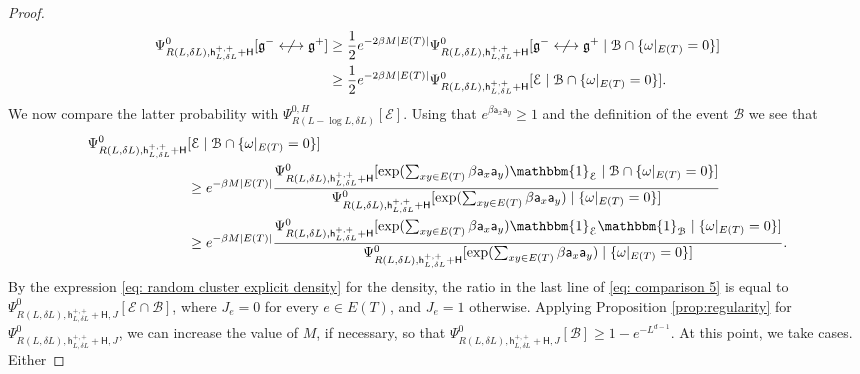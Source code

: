 \documentclass[11pt,a4paper]{article}
\theoremstyle{definition}
\numberwithin{equation}{section}
\newcommand\fg{\mathfrak{g}}
\begin{document}
\begin{proof}
\begin{equation}
\begin{aligned}
\Psi^{0}_{R(L,\delta L),\mathsf{h}^{+,+}_{L,\delta L}+\mathsf{H}}[\fg^{-} \centernot \longleftrightarrow \fg^{+}]&\geq \frac{1}{2} e^{-2\beta M |E(T)|}\Psi^{0}_{R(L,\delta L),\mathsf{h}^{+,+}_{L,\delta L}+\mathsf{H}}[\fg^{-} \centernot \longleftrightarrow \fg^{+}\mid \mathcal{B}\cap \{ \omega|_{E(T)}=0 \}]\\
&\geq \frac{1}{2} e^{-2\beta M |E(T)|}\Psi^{0}_{R(L,\delta L),\mathsf{h}^{+,+}_{L,\delta L}+\mathsf{H}}[\mathcal{E}\mid \mathcal{B}\cap \{ \omega|_{E(T)}=0 \}].
\end{aligned}
\end{equation}
We now compare the latter probability with $\Psi^{0,H}_{R(L-\log L,\delta L)}[\mathcal{E}]$.
Using that $e^{\beta \mathsf{a}_x \mathsf{a}_y}\geq 1$ and the definition of the event $\mathcal{B}$ we see that
\begin{equation}\label{eq: comparison 5}
\begin{aligned}
\Psi^{0}_{R(L,\delta L),\mathsf{h}^{+,+}_{L,\delta L}+\mathsf{H}}&[\mathcal{E}\mid \mathcal{B}\cap \{ \omega|_{E(T)}=0 \}] \\
 &\geq e^{-\beta M |E(T)|}\frac{\Psi^{0}_{R(L,\delta L),\mathsf{h}^{+,+}_{L,\delta L}+\mathsf{H}}[\exp(\sum_{xy \in E(T)}\beta \mathsf{a}_x \mathsf{a}_y)\mathbbm{1}_{\mathcal{E}} \mid \mathcal{B}\cap  \{ \omega|_{E(T)}=0 \}]}{\Psi^{0}_{R(L,\delta L),\mathsf{h}^{+,+}_{L,\delta L}+\mathsf{H}}[\exp(\sum_{xy \in E(T)}\beta \mathsf{a}_x \mathsf{a}_y) \mid   \{ \omega|_{E(T)}=0\}]}\\
  &\geq e^{-\beta M |E(T)|}\frac{\Psi^{0}_{R(L,\delta L),\mathsf{h}^{+,+}_{L,\delta L}+\mathsf{H}}[\exp(\sum_{xy \in E(T)}\beta \mathsf{a}_x \mathsf{a}_y)\mathbbm{1}_{\mathcal{E}} \mathbbm{1}_{\mathcal{B}} \mid   \{ \omega|_{E(T)}=0 \}]}{\Psi^{0}_{R(L,\delta L),\mathsf{h}^{+,+}_{L,\delta L}+\mathsf{H}}[\exp(\sum_{xy \in E(T)}\beta \mathsf{a}_x \mathsf{a}_y) \mid   \{ \omega|_{E(T)}=0 \}]}.
\end{aligned}
\end{equation}
By the expression \eqref{eq: random cluster explicit density} for the density, the ratio in the last line of \eqref{eq: comparison 5} is equal to $\Psi^{0}_{R(L,\delta L),\mathsf{h}^{+,+}_{L,\delta L}+\mathsf{H},J}[\mathcal{E} \cap \mathcal{B}]$, where $J_e=0$ for every $e\in E(T)$, and $J_e=1$ otherwise. Applying Proposition \ref{prop:regularity} for $\Psi^{0}_{R(L,\delta L),\mathsf{h}^{+,+}_{L,\delta L}+\mathsf{H},J}$, we can increase the value of $M$, if necessary, so that $\Psi^{0}_{R(L,\delta L),\mathsf{h}^{+,+}_{L,\delta L}+\mathsf{H},J}[\mathcal{B}]\geq 1-e^{-L^{d-1}}$. At this point, we take cases. Either

\end{proof}
\end{document}
